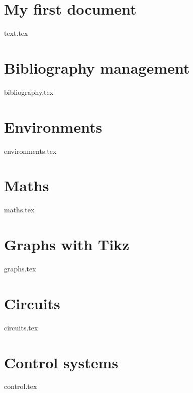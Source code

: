 \section{My first document}
    {text.tex}
\section{Bibliography management}
    {bibliography.tex}
\section{Environments}
    {environments.tex}
\section{Maths}
    {maths.tex}
\section{Graphs with Tikz}
    {graphs.tex}
\section{Circuits}
    {circuits.tex}
\section{Control systems}
    {control.tex}